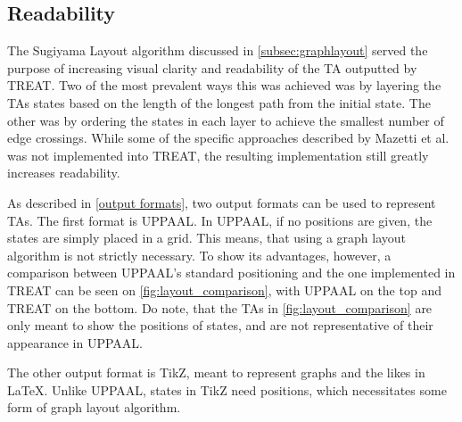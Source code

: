 \subsection{Readability}

The Sugiyama Layout algorithm discussed in \cref{subsec:graphlayout} served the purpose of increasing visual clarity and readability of the TA outputted by TREAT.
Two of the most prevalent ways this was achieved was by layering the TAs states based on the length of the longest path from the initial state. The other was by ordering the states in each layer to achieve the smallest number of edge crossings.
While some of the specific approaches described by Mazetti et al. \cite{Mazetti2012} was not implemented into TREAT, the resulting implementation still greatly increases readability.

As described in \cref{output formats}, two output formats can be used to represent TAs. The first format is UPPAAL. In UPPAAL, if no positions are given, the states are simply placed in a grid. This means, that using a graph layout algorithm is not strictly necessary. To show its advantages, however, a comparison between UPPAAL's standard positioning and the one implemented in TREAT can be seen on \cref{fig:layout_comparison}, with UPPAAL on the top and TREAT on the bottom.
Do note, that the TAs in \cref{fig:layout_comparison} are only meant to show the positions of states, and are not representative of their appearance in UPPAAL.

\begin{center}
    
\end{center}

\vspace{1em}

The other output format is TikZ, meant to represent graphs and the likes in LaTeX. Unlike UPPAAL, states in TikZ need positions, which necessitates some form of graph layout algorithm.




